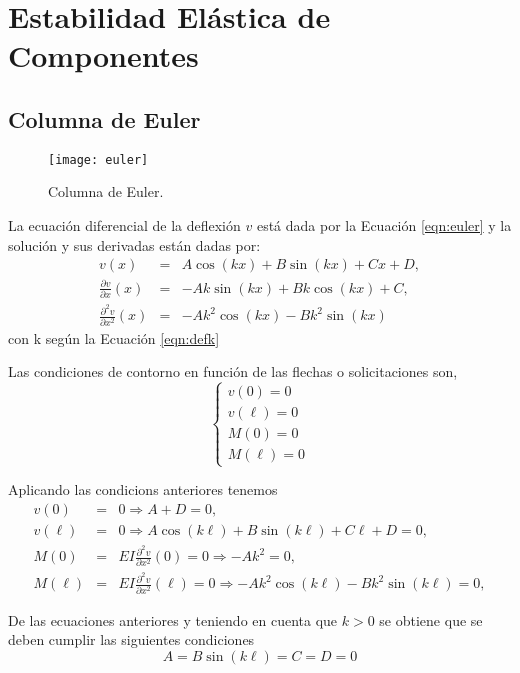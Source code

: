 \section{Estabilidad Elástica de Componentes} \label{sec:componentes}

\subsection{Columna de Euler}


\begin{figure}[htb]
	\centering
	\texttt{[image: euler]}
	\caption{Columna de Euler.}
	\label{fig:euler}
\end{figure}

La ecuación diferencial de la deflexión $v$ está dada por la Ecuación \eqref{eqn:euler} y la solución y sus derivadas están dadas por:
\begin{eqnarray}
v(x) &=& A \cos(k x ) + B \sin(kx) + C x + D, \\
\frac{\partial   v}{\partial x  } (x) &=& -A k \sin(k x ) + B k \cos(kx) + C , \\
\frac{\partial^2 v}{\partial x^2} (x) &=& - A k^2 \cos(k x ) - B k^2 \sin(kx)
\end{eqnarray}
con k según la Ecuación \eqref{eqn:defk}

Las condiciones de contorno en función de las flechas o solicitaciones son,
\begin{equation}
\left\{
\begin{array}{l}
v(0)=0 \\[.5em]
\displaystyle v(\ell)=0\\[1em]
M(0)=0\\[.5em]
M(\ell)=0
\end{array}
\right.
\end{equation}

Aplicando las condicions anteriores tenemos
\begin{eqnarray}
v(0) &=& 0 \Rightarrow A + D = 0, \\
v(\ell) &=& 0 \Rightarrow A \cos(k \ell) + B \sin(k \ell) + C \ell + D = 0, \\
M(0) &=& EI \frac {\partial^2 v}{\partial x^2} (0) = 0 \Rightarrow -Ak^2 = 0,  \\
M(\ell) &=& EI \frac{\partial^2 v}{\partial x^2} (\ell) = 0  \Rightarrow -Ak^2\cos(k \ell) -  B k^2 \sin(k\ell) = 0,
\end{eqnarray}

De las ecuaciones anteriores y teniendo en cuenta que $k>0$ se obtiene que se deben cumplir las siguientes condiciones
\begin{equation}
A = B\sin(k\ell) = C = D = 0
\end{equation}

